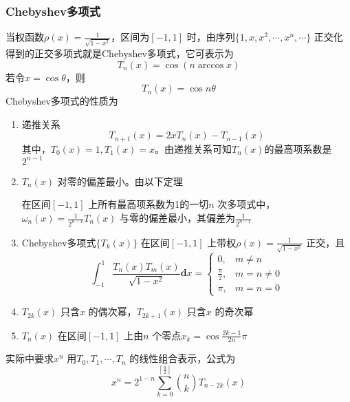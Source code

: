 \documentclass[a4paper]{article}
\begin{document}
\subsubsection{Chebyshev多项式}
当权函数$\rho(x) = \frac{1}{\sqrt{1 - x^2} }$，区间为$[-1,1]$ 时，由序列$\{1, x, x^2, \cdots, x^{n}, \cdots\} $ 正交化得到的正交多项式就是Chebyshev多项式，它可表示为
\[
T_n(x) = \cos (n\arccos x)
\] 
若令$x = \cos \theta$，则
\[
T_n(x) = \cos n\theta
\] 
Chebyshev多项式的性质为
\begin{enumerate}
	\item 递推关系
		\[
			T_{n+1}(x) = 2 x T_n(x) - T_{n-1}(x)
		\] 
		其中，$T_0(x) = 1, T_1(x) = x$。由递推关系可知$T_n(x)$的最高项系数是$2^{n-1}$
	\item $T_n(x)$ 对零的偏差最小。由以下定理
		\begin{definition}
			在区间$[-1,1]$ 上所有最高项系数为1的一切$n$ 次多项式中，$\omega_n(x) = \frac{1}{2^{n-1}}T_n(x)$ 与零的偏差最小，其偏差为$\frac{1}{2^{n-1}}$
		\end{definition}
	\item Chebyshev多项式$\{ T_k(x) \} $ 在区间$[-1,1]$ 上带权$\rho(x) = \frac{1}{\sqrt{1 - x^2} }$ 正交，且
		\[
		\int_{-1}^{1} \frac{T_n(x) T_m(x)}{\sqrt{1 - x^2} } \mathbf{d} x = 
		\begin{cases}
			0, & m \neq n \\
			\frac{\pi}{2}, & m = n \neq 0 \\
			\pi, & m = n = 0
		\end{cases}
		\] 
	\item $T_{2k}(x)$ 只含$x$ 的偶次幂，$T_{2k+1}(x)$ 只含$x$ 的奇次幂
	\item $T_n(x)$ 在区间$[-1,1]$ 上由$n$ 个零点$x_k = \cos \frac{2k-1}{2n}\pi$
\end{enumerate}

实际中要求$x^{n}$ 用$T_0, T_1, \cdots, T_n$ 的线性组合表示，公式为
\[
	x^{n} = 2^{1-n} \sum_{k=0}^{\left[ \frac{n}{2} \right]} {n \choose k} T_{n-2k}(x) 
\] 
\end{document}

